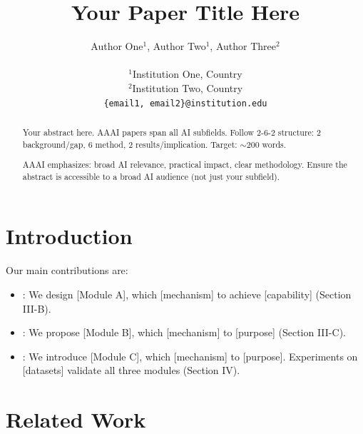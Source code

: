 \documentclass[letterpaper]{article}
\title{Your Paper Title Here}
\author{
  Author One${}^1$,
  Author Two${}^1$,
  Author Three${}^2$ \\
  \\
  ${}^1$Institution One, Country \\
  ${}^2$Institution Two, Country \\
  \texttt{\{email1, email2\}@institution.edu}
}
\begin{document}
\maketitle

\begin{abstract}
  Your abstract here. AAAI papers span all AI subfields.
  Follow 2-6-2 structure: 2 background/gap, 6 method, 2 results/implication.
  Target: $\sim$200 words.

  AAAI emphasizes: broad AI relevance, practical impact, clear methodology.
  Ensure the abstract is accessible to a broad AI audience (not just your subfield).
\end{abstract}

\section{Introduction}


Our main contributions are:
\begin{itemize}
  \item [Innovation 1 contribution]: We design [Module A], which [mechanism]
        to achieve [capability] (Section III-B).
  \item [Innovation 2 contribution]: We propose [Module B], which [mechanism]
        to [purpose] (Section III-C).
  \item [Innovation 3 contribution]: We introduce [Module C], which [mechanism]
        to [purpose]. Experiments on [datasets] validate all three modules
        (Section IV).
\end{itemize}

\section{Related Work}
\end{document}
